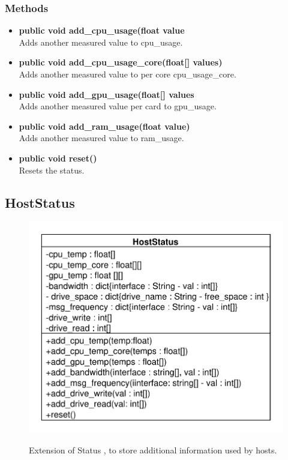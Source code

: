 \subsubsection{Methods}
\begin{itemize}
	\item \textbf{public void add\_cpu\_usage(float value}\\
	Adds another measured value to cpu\_usage.
	\item \textbf{public void add\_cpu\_usage\_core(float[] values)}\\
	Adds another measured value to per core cpu\_usage\_core.
	\item \textbf{public void add\_gpu\_usage(float[] values}\\
	Adds another measured value per card to gpu\_usage.
	\item \textbf{public void add\_ram\_usage(float value)}\\
	Adds another measured value to ram\_usage.
	\item \textbf{public void reset()}\\
	Resets the status.
\end{itemize}

\subsection{HostStatus}

\begin{figure}[htbp]
	\begin{minipage}[t]{7cm}
		\vspace{0pt}
		\centering
		\includegraphics[scale=0.6]{./diagram_pictures/NodeInterface/HostStatus.pdf}
	\end{minipage}
	\hfill
	\begin{minipage}[t]{7cm}
		\vspace{10pt}
		Extension of Status , to store additional information used by hosts.
	\end{minipage}
\end{figure}


